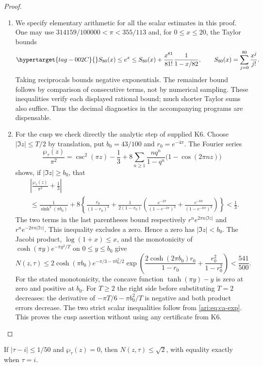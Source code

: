 \begin{proof}
\begin{enumerate}[label=\arabic*.,leftmargin=*]
\item We specify elementary arithmetic for all the scalar estimates in
this proof. One may use $314159/100000<\pi<355/113$ and, for
$0\le x\le20$, the Taylor bounds
\begin{equation}\hypertarget{tag-002C}{}\label{ari:eq:ca-exp}
 S_{80}(x)\le e^x\le
 S_{80}(x)+\frac{x^{81}}{81!}\frac1{1-x/82},
 \qquad S_{80}(x)=\sum_{j=0}^{80}\frac{x^j}{j!}.
\end{equation}
Taking reciprocals bounds negative exponentials. The remainder
bound follows by comparison of consecutive terms, not by numerical
sampling. These inequalities verify each displayed rational bound;
much shorter Taylor sums also suffice. Thus the decimal diagnostics
in the accompanying programs are dispensable.

\item For the cusp we check directly the analytic step of supplied K6.
Choose $|\Im z|\le T/2$ by translation, put $b_0=43/100$ and
$r_0=e^{-4\pi}$. The Fourier series
\[
 \frac{\wp_\tau(z)}{\pi^2}
 =\csc^2(\pi z)-\frac13
   +8\sum_{n\ge1}\frac{nq^n}{1-q^n}
          \bigl(1-\cos(2\pi nz)\bigr)
\]
shows, if $|\Im z|\ge b_0$, that
\begin{align*}
 &\left|\frac{\wp_\tau(z)}{\pi^2}+\frac13\right|\\
 &\le \frac1{\sinh^2(\pi b_0)}
 +8\left\{\frac{r_0}{(1-r_0)^3}
 +\frac1{2(1-r_0)}
 \left(\frac{e^{-2\pi}}{(1-e^{-2\pi})^2}
       +\frac{e^{-6\pi}}{(1-e^{-6\pi})^2}\right)\right\}
 <\frac13.
\end{align*}
The two terms in the last parentheses bound respectively
$r^n e^{2\pi n|\Im z|}$ and $r^n e^{-2\pi n|\Im z|}$.
This inequality excludes a zero. Hence a zero has
$|\Im z|<b_0$. The Jacobi product, $\log(1+x)\le x$, and
the monotonicity of $\cosh(\pi y)e^{-\pi y^2/T}$ on
$0\le y\le b_0$ give
\[
 N(z,\tau)\le
 2\cosh(\pi b_0)e^{-\pi/3-\pi b_0^2/2}
 \exp\!\left(
 \frac{2\cosh(2\pi b_0)r_0}{1-r_0}
 +\frac{r_0^2}{1-r_0^2}\right)<\frac{541}{500}.
\]
For the stated monotonicity, the concave function
$\tanh(\pi y)-y$ is zero at zero and positive at $b_0$.
For $T\ge2$ the right side before substituting $T=2$ decreases:
the derivative of $-\pi T/6-\pi b_0^2/T$ is negative and
both product errors decrease. The two strict scalar inequalities
follow from \eqref{ari:eq:ca-exp}. This proves the cusp assertion
without using any certificate from K6.
\end{enumerate}
\end{proof}

\begin{proposition}\hypertarget{tag-001Q}{}\label{ari:C.8.2}

If $|\tau-i|\le1/50$ and $\wp_\tau(z)=0$, then
$N(z,\tau)\le\sqrt2$, with equality exactly when $\tau=i$.
\end{proposition}


